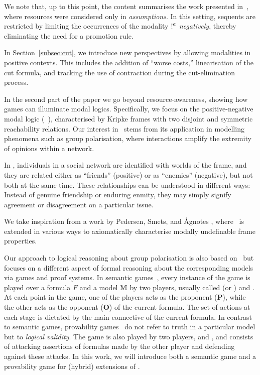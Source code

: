 We note that, up to this point, the content summarises the work presented in~\cite{DBLP:conf/tableaux/LangOPF19}, where resources were considered only in {\em assumptions}. In this setting, sequents are restricted by limiting the occurrences of the modality $\hbox{$\mathop{!}^{a}$}$ {\em negatively}, thereby eliminating the need for a promotion rule.

In Section~\ref{subsec:cut}, we introduce new perspectives by allowing modalities in positive contexts. This includes the addition of ``worse costs,'' linearisation of the cut formula, and tracking the use of contraction during the cut-elimination process.

In the second part of the paper we go beyond resource-awareness, showing how games can illuminate modal logics. Specifically, we focus on the positive-negative modal logic (\PNL~\cite{DBLP:journals/jolli/XiongA20}), characterised by Kripke frames with two disjoint and symmetric reachability relations. Our interest in \PNL\ stems from its application in modelling phenomena such as group polarisation, where interactions amplify the extremity of opinions within a network. 

In \PNL, individuals in a
social network are identified with worlds of the frame, and they are related
either as ``friends'' (positive) or as ``enemies'' (negative), but not both at
the same time. These relationships can be understood in different ways: Instead
of genuine friendship or enduring enmity, they may simply signify agreement or
disagreement on a particular issue. 

We take inspiration from a work by Pedersen, Smets, and {\AA}gnotes
\cite{DBLP:journals/logcom/PedersenSA21}, where \PNL~is extended in
various ways to axiomatically characterise modally undefinable frame
properties.
 
Our approach to logical reasoning about group
polarisation is also based on \PNL~but focuses on a different aspect
of formal reasoning about the corresponding models via games and proof systems. In semantic games~\cite{Hintikka1973-HINLLA-2}, every instance of the game is played over a formula $F$ and a model $\mathbb{M}$ by two players, usually called \Ic (or \Me) and \You. At each point in the game, one of the players acts as the proponent ($\mathbf P$), while the other acts as the opponent ($\mathbf O$) of the current formula. The set of actions at each stage is dictated by the main connective of the current formula. 
In contrast to semantic games, provability games~\cite{Lorenzen1978-LORDLJ-2} do not refer to truth in a particular model but to {\em logical validity}. The game is also played by two players, \Me and \You, and consists of attacking assertions of formulas made by the other player and defending against these attacks. In this work, we will introduce both a semantic game and a provability game for (hybrid) extensions of \PNL.

